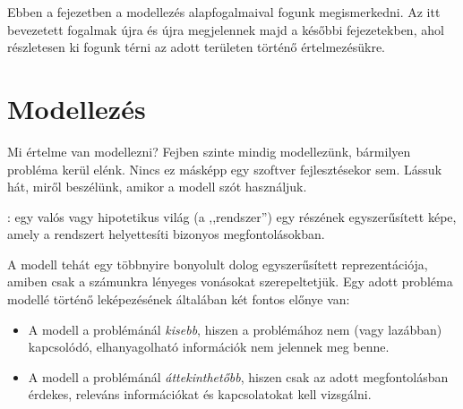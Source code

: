 
Ebben a fejezetben a modellezés alapfogalmaival fogunk megismerkedni. Az itt bevezetett fogalmak újra és újra megjelennek majd a későbbi fejezetekben, ahol részletesen ki fogunk térni az adott területen történő értelmezésükre.


\section{Modellezés}

Mi értelme van modellezni? Fejben szinte mindig modellezünk, bármilyen probléma kerül elénk. Nincs ez másképp egy szoftver fejlesztésekor sem. Lássuk hát, miről beszélünk, amikor a modell szót használjuk.

\begin{definicio}
	: egy valós vagy hipotetikus világ (a ,,rendszer'') egy részének egyszerűsített képe, amely a rendszert helyettesíti bizonyos megfontolásokban.
\end{definicio}

A modell tehát egy többnyire bonyolult dolog egyszerűsített reprezentációja, amiben csak a számunkra lényeges vonásokat szerepeltetjük.
Egy adott probléma modellé történő leképezésének általában két fontos előnye van: %

\begin{itemize}
	\item A modell a problémánál \emph{kisebb}, hiszen a problémához nem (vagy lazábban) kapcsolódó, elhanyagolható információk nem jelennek meg benne.
	\item A modell a problémánál \emph{áttekinthetőbb}, hiszen csak az adott megfontolásban érdekes, releváns információkat és kapcsolatokat kell vizsgálni.
\end{itemize}

